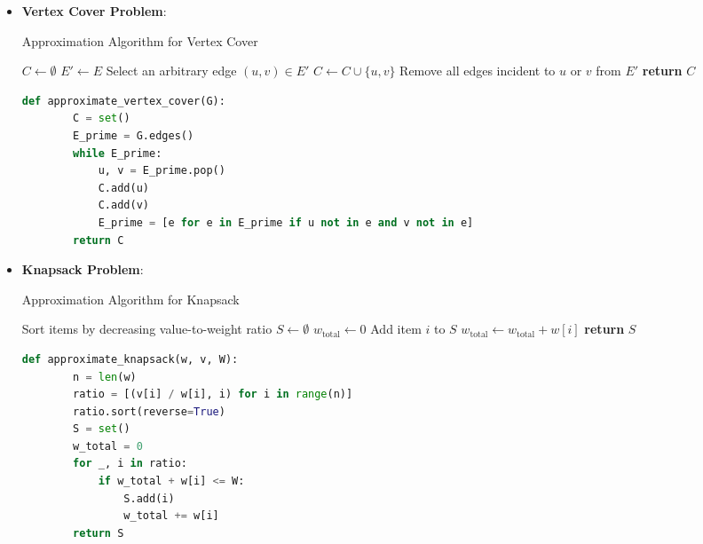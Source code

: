 \documentclass[12pt]{book} %
\begin{document}
\begin{itemize}
    \item \textbf{Vertex Cover Problem}:
    
    \begin{algorithm}[H]
    \caption{Approximation Algorithm for Vertex Cover}
    \begin{algorithmic}[1]
        \State $C \gets \emptyset$ 
        \State $E' \gets E$ 
            \State Select an arbitrary edge $(u,v) \in E'$
            \State $C \gets C \cup \{u, v\}$ 
            \State Remove all edges incident to $u$ or $v$ from $E'$
        \EndWhile
        \State \textbf{return} $C$
    \EndFunction
    \end{algorithmic}
    \end{algorithm}
    
    \FloatBarrier
    \begin{lstlisting}[language=Python, caption=Python Implementation of Approximation Algorithm for Vertex Cover]
    def approximate_vertex_cover(G):
        C = set()
        E_prime = G.edges()
        while E_prime:
            u, v = E_prime.pop()
            C.add(u)
            C.add(v)
            E_prime = [e for e in E_prime if u not in e and v not in e]
        return C
    \end{lstlisting}
    \FloatBarrier
    
    \item \textbf{Knapsack Problem}:
    
    \begin{algorithm}[H]
    \caption{Approximation Algorithm for Knapsack}
    \begin{algorithmic}[1]
        \State Sort items by decreasing value-to-weight ratio
        \State $S \gets \emptyset$ 
        \State $w_{\text{total}} \gets 0$
                \State Add item $i$ to $S$
                \State $w_{\text{total}} \gets w_{\text{total}} + w[i]$
            \EndIf
        \EndFor
        \State \textbf{return} $S$
    \EndFunction
    \end{algorithmic}
    \end{algorithm}
    
    \FloatBarrier
    \begin{lstlisting}[language=Python, caption=Python Implementation of Approximation Algorithm for Knapsack]
    def approximate_knapsack(w, v, W):
        n = len(w)
        ratio = [(v[i] / w[i], i) for i in range(n)]
        ratio.sort(reverse=True)
        S = set()
        w_total = 0
        for _, i in ratio:
            if w_total + w[i] <= W:
                S.add(i)
                w_total += w[i]
        return S
    \end{lstlisting}
    \FloatBarrier
\end{itemize}
\end{document}
